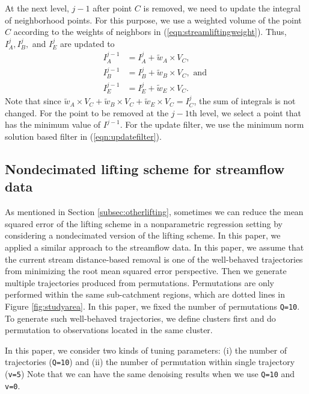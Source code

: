 \documentclass[11pt,titlepage]{article}
\begin{document}
At the next level, $j-1$ after point $C$ is removed, we need to update the integral of neighborhood points. For this purpose, we use a weighted volume of the point $C$ according to the weights of neighbors in (\ref{eqn:streamliftingweight}). Thus, $I_A^{j}, I_{B}^{j},$ and $I_E^{j}$ are updated to
\begin{align}
I_A^{j-1}&=I_A^{j} + \tilde{w}_A\times V_C,\nonumber\\
I_B^{j-1}&= I_B^{j} + \tilde{w}_B \times V_C, \text{ and }\\
I_E^{j-1} &= I_E^{j} + \tilde{w}_E \times V_C.\nonumber
\end{align}
Note that since $\tilde{w}_A\times V_C +\tilde{w}_B \times V_C+ \tilde{w}_E \times V_C=I_C^{j}$, the sum of integrals is not changed. For the point to be removed at the $j-1$th level, we select a point that has the minimum value of $I^{j-1}$. For the update filter, we use the minimum norm solution based filter in (\ref{eqn:updatefilter}).

\subsection{Nondecimated lifting scheme for streamflow data}

As mentioned in Section \ref{subsec:otherlifting}, sometimes we can reduce the mean squared error of the lifting scheme in a nonparametric regression setting by considering a nondecimated version of the lifting scheme. In this paper, we applied a similar approach to the streamflow data. In this paper, we assume that the current stream distance-based removal is one of the well-behaved trajectories from minimizing the root mean squared error perspective. Then we generate multiple trajectories produced from permutations. Permutations are only performed within the same sub-catchment regions, which are dotted lines in Figure \ref{fig:studyarea}. In this paper, we fixed the number of permutations \texttt{Q=10}. To generate such well-behaved trajectories, we define clusters first and do permutation to observations located in the same cluster.

In this paper, we consider two kinds of tuning parameters: (i) the number of trajectories (\texttt{Q=10}) and (ii) the number of permutation within single trajectory (\texttt{v=5}) Note that we can have the same denoising results when we use \texttt{Q=10} and \texttt{v=0}.
\end{document}

